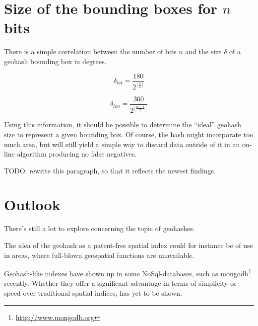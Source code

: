 \documentclass[a4paper,11pt,oneside]{scrartcl}
\begin{document}
\section{Size of the bounding boxes for $n$ bits} %
\label{sec:Size of the bounding boxes for $n$ bits}
There is a simple correlation between the number of bits $n$ and the size $\delta$ of a geohash bounding box in degrees.

\begin{displaymath}
  \delta_{lat} = \frac{180}{2^{\lfloor \frac{n}{2} \rfloor}}
\end{displaymath}

\begin{displaymath}
  \delta_{lon} = \frac{360}{2^{\lfloor \frac{n+1}{2} \rfloor}}
\end{displaymath}

Using this information, it should be possible to determine the “ideal” geohash size to represent a given bounding box. Of course, the hash might incorporate too much area, but will still yield a simple way to discard data outside of it in an on-line algorithm producing no false negatives.

TODO: rewrite this paragraph, so that it reflects the newest findings.




\section{Outlook} %
\label{sec:Outlook}
There's still a lot to explore concerning the topic of geohashes.

The idea of the geohash as a patent-free spatial index could for instance be of use in areas, where full-blown geospatial functions are unavailable.

Geohash-like indexes have shown up in some NoSql-databases, such as mongodb\footnote{\url{http://www.mongodb.org}} recently. Whether they offer a significant advantage in terms of simplicity or speed over traditional spatial indices, has yet to be shown.

\end{document}
